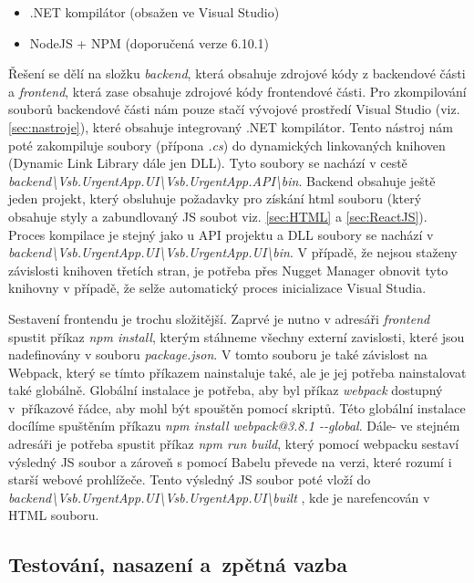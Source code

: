 \begin{itemize}
	\item .NET kompilátor (obsažen ve Visual Studio)
	\item NodeJS + NPM (doporučená verze 6.10.1)
\end{itemize}

Řešení se dělí na složku \textit{backend}, která obsahuje zdrojové kódy z backendové části a \textit{frontend}, která zase obsahuje zdrojové kódy frontendové části. Pro zkompilování souborů backendové části nám pouze stačí vývojové prostředí Visual Studio (viz. \ref{sec:nastroje}), které obsahuje integrovaný .NET kompilátor. Tento nástroj nám poté zakompiluje soubory (přípona \textit{.cs}) do dynamických linkovaných knihoven (Dynamic Link Library dále jen DLL). Tyto soubory se nachází v cestě \textit{backend\textbackslash Vsb.UrgentApp.UI\textbackslash Vsb.UrgentApp.API\textbackslash bin}. Backend obsahuje ještě jeden projekt, který obsluhuje požadavky pro získání html souboru (který obsahuje styly a zabundlovaný JS soubot viz. \ref{sec:HTML} a \ref{sec:ReactJS}). Proces kompilace je stejný jako u API projektu a DLL soubory se nachází v \textit{backend\textbackslash Vsb.UrgentApp.UI\textbackslash Vsb.UrgentApp.UI\textbackslash bin}. V případě, že nejsou staženy závislosti knihoven třetích stran, je potřeba přes Nugget Manager obnovit tyto knihovny v případě, že selže automatický proces inicializace Visual Studia. 

Sestavení frontendu je trochu složitější. Zaprvé je nutno v adresáři \textit{frontend} spustit příkaz \textit{npm install}, kterým stáhneme všechny externí zavislosti, které jsou nadefinovány v souboru \textit{package.json}. V tomto souboru je také závislost na Webpack, který se tímto příkazem nainstaluje také, ale je jej potřeba nainstalovat také globálně. Globální instalace je potřeba, aby byl příkaz \textit{webpack} dostupný v~příkazové řádce, aby mohl být spouštěn pomocí skriptů. Této globální instalace docílíme spuštěním příkazu \textit{npm install webpack@3.8.1 -{}-global}. Dále- ve stejném adresáři je potřeba spustit příkaz \textit{npm run build}, který pomocí webpacku sestaví výsledný JS soubor a zároveň s pomocí Babelu převede na verzi, které rozumí i starší webové prohlížeče. Tento výsledný JS soubor poté vloží do \textit{backend\textbackslash Vsb.UrgentApp.UI\textbackslash Vsb.UrgentApp.UI\textbackslash built }, kde je narefencován v HTML souboru.


\subsection{Testování, nasazení a~zpětná vazba}

